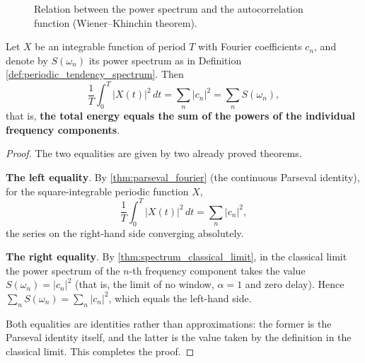 \begin{figure}[htbp]
\centering
{}
\caption{Relation between the power spectrum and the autocorrelation function (Wiener--Khinchin theorem).}
\label{fig:power_spectrum_autocorrelation}
\end{figure}

\begin{corollary}\label{cor:six_spectrum_family}
Let $X$ be an integrable function of period $T$ with Fourier coefficients $c_n$, and denote by $S(\omega_n)$ its power spectrum as in Definition \cref{def:periodic_tendency_spectrum}. Then
\[
\frac{1}{T}\int_0^T |X(t)|^2\,dt = \sum_n |c_n|^2 = \sum_n S(\omega_n),
\]
that is, \textbf{the total energy equals the sum of the powers of the individual frequency components}.
\end{corollary}

\begin{proof}
The two equalities are given by two already proved theorems.

\textbf{The left equality}. By \cref{thm:parseval_fourier} (the continuous Parseval identity), for the square-integrable periodic function $X$,
\[
\frac{1}{T}\int_0^T |X(t)|^2\,dt = \sum_{n} |c_n|^2 ,
\]
the series on the right-hand side converging absolutely.

\textbf{The right equality}. By \cref{thm:spectrum_classical_limit}, in the classical limit the power spectrum of the $n$-th frequency component takes the value $S(\omega_n) = |c_n|^2$ (that is, the limit of no window, $\alpha = 1$ and zero delay). Hence $\sum_n S(\omega_n) = \sum_n |c_n|^2$, which equals the left-hand side.

Both equalities are identities rather than approximations: the former is the Parseval identity itself, and the latter is the value taken by the definition in the classical limit. This completes the proof.
\end{proof}

